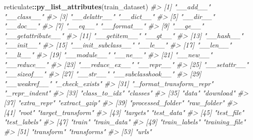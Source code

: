\documentclass[]{book}
\newenvironment{Shaded}{\begin{snugshade}}{\end{snugshade}}
\newcommand{\CommentTok}[1]{\textcolor[rgb]{0.56,0.35,0.01}{\textit{#1}}}
\newcommand{\DataTypeTok}[1]{\textcolor[rgb]{0.13,0.29,0.53}{#1}}
\newcommand{\KeywordTok}[1]{\textcolor[rgb]{0.13,0.29,0.53}{\textbf{#1}}}
\newcommand{\NormalTok}[1]{#1}
\newcommand{\OperatorTok}[1]{\textcolor[rgb]{0.81,0.36,0.00}{\textbf{#1}}}
\newcommand{\StringTok}[1]{\textcolor[rgb]{0.31,0.60,0.02}{#1}}
\begin{document}
\begin{Shaded}
\begin{Highlighting}[]
\NormalTok{reticulate}\OperatorTok{::}\KeywordTok{py_list_attributes}\NormalTok{(train_dataset)}
\CommentTok{#>  [1] "__add__"                "__class__"             }
\CommentTok{#>  [3] "__delattr__"            "__dict__"              }
\CommentTok{#>  [5] "__dir__"                "__doc__"               }
\CommentTok{#>  [7] "__eq__"                 "__format__"            }
\CommentTok{#>  [9] "__ge__"                 "__getattribute__"      }
\CommentTok{#> [11] "__getitem__"            "__gt__"                }
\CommentTok{#> [13] "__hash__"               "__init__"              }
\CommentTok{#> [15] "__init_subclass__"      "__le__"                }
\CommentTok{#> [17] "__len__"                "__lt__"                }
\CommentTok{#> [19] "__module__"             "__ne__"                }
\CommentTok{#> [21] "__new__"                "__reduce__"            }
\CommentTok{#> [23] "__reduce_ex__"          "__repr__"              }
\CommentTok{#> [25] "__setattr__"            "__sizeof__"            }
\CommentTok{#> [27] "__str__"                "__subclasshook__"      }
\CommentTok{#> [29] "__weakref__"            "_check_exists"         }
\CommentTok{#> [31] "_format_transform_repr" "_repr_indent"          }
\CommentTok{#> [33] "class_to_idx"           "classes"               }
\CommentTok{#> [35] "data"                   "download"              }
\CommentTok{#> [37] "extra_repr"             "extract_gzip"          }
\CommentTok{#> [39] "processed_folder"       "raw_folder"            }
\CommentTok{#> [41] "root"                   "target_transform"      }
\CommentTok{#> [43] "targets"                "test_data"             }
\CommentTok{#> [45] "test_file"              "test_labels"           }
\CommentTok{#> [47] "train"                  "train_data"            }
\CommentTok{#> [49] "train_labels"           "training_file"         }
\CommentTok{#> [51] "transform"              "transforms"            }
\CommentTok{#> [53] "urls"}
\end{Highlighting}
\end{Shaded}

\begin{Shaded}
\end{Shaded}
\end{document}
